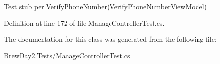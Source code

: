 Test stub per Verify\+Phone\+Number(\+Verify\+Phone\+Number\+View\+Model)



Definition at line 172 of file Manage\+Controller\+Test.\+cs.



The documentation for this class was generated from the following file\+:\begin{DoxyCompactItemize}
\item 
Brew\+Day2.\+Tests/\mbox{\hyperlink{_manage_controller_test_8cs}{Manage\+Controller\+Test.\+cs}}\end{DoxyCompactItemize}
